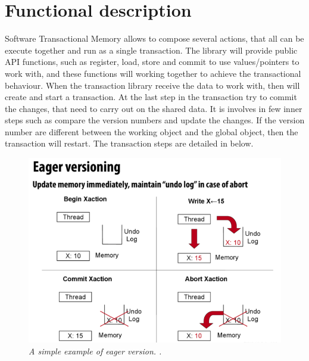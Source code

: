 \documentclass[12pt]{article}
\begin{document}
\section{Functional description}
Software Transactional Memory allows to compose several actions, that all can be execute together and run as a single transaction. The library will provide public API functions, such as register, load, store and commit to use values/pointers to work with, and these functions will working together to achieve the transactional behaviour. When the transaction library receive the data to work with, then will create and start a transaction. At the last step in the transaction try to commit the changes, that need to carry out on the shared data. It is involves in few inner steps such as compare the version numbers and update the changes. If the version number are different between the working object and the global object, then the transaction will restart. The transaction steps are detailed in below.

\begin{figure}[h!]
\centering
\includegraphics[scale=0.4]{Pictures/eager.png}
\caption{\textit{\color{gray}A simple example of eager version. \cite{Xelblade}.}}
\end{figure}
\end{document}
